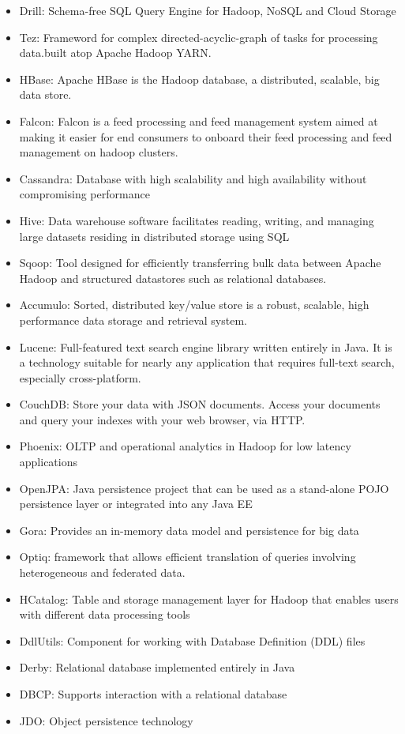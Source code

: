 \documentclass[natbib]{svjour3}
\providecommand{\tightlist}{%
  \setlength{\itemsep}{0pt}\setlength{\parskip}{0pt}}
\begin{document}
\begin{itemize}
\tightlist
\item
  Drill: Schema-free SQL Query Engine for Hadoop, NoSQL and Cloud
  Storage
\item
  Tez: Frameword for complex directed-acyclic-graph of tasks for
  processing data.built atop Apache Hadoop YARN.
\item
  HBase: Apache HBase is the Hadoop database, a distributed, scalable,
  big data store.
\item
  Falcon: Falcon is a feed processing and feed management system aimed
  at making it easier for end consumers to onboard their feed processing
  and feed management on hadoop clusters.
\item
  Cassandra: Database with high scalability and high availability
  without compromising performance
\item
  Hive: Data warehouse software facilitates reading, writing, and
  managing large datasets residing in distributed storage using SQL
\item
  Sqoop: Tool designed for efficiently transferring bulk data between
  Apache Hadoop and structured datastores such as relational databases.
\item
  Accumulo: Sorted, distributed key/value store is a robust, scalable,
  high performance data storage and retrieval system.
\item
  Lucene: Full-featured text search engine library written entirely in
  Java. It is a technology suitable for nearly any application that
  requires full-text search, especially cross-platform.
\item
  CouchDB: Store your data with JSON documents. Access your documents
  and query your indexes with your web browser, via HTTP.
\item
  Phoenix: OLTP and operational analytics in Hadoop for low latency
  applications
\item
  OpenJPA: Java persistence project that can be used as a stand-alone
  POJO persistence layer or integrated into any Java EE
\item
  Gora: Provides an in-memory data model and persistence for big data
\item
  Optiq: framework that allows efficient translation of queries
  involving heterogeneous and federated data.
\item
  HCatalog: Table and storage management layer for Hadoop that enables
  users with different data processing tools
\item
  DdlUtils: Component for working with Database Definition (DDL) files
\item
  Derby: Relational database implemented entirely in Java
\item
  DBCP: Supports interaction with a relational database
\item
  JDO: Object persistence technology
\end{itemize}
\end{document}
